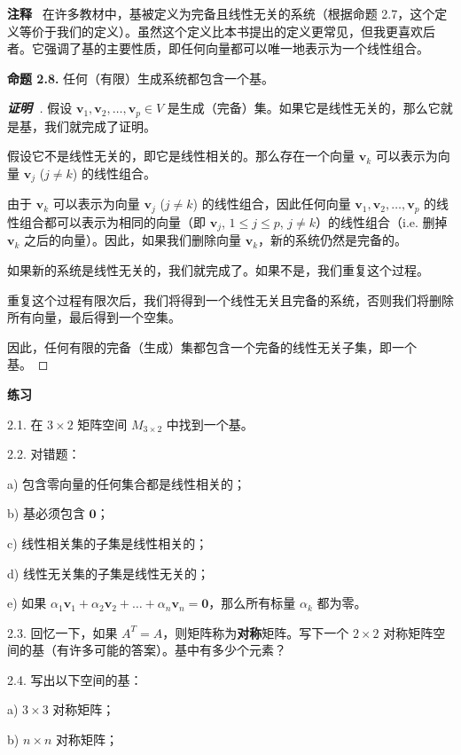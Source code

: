 \textbf{注释}~ 在许多教材中，基被定义为完备且线性无关的系统（根据命题 2.7，这个定义等价于我们的定义）。虽然这个定义比本书提出的定义更常见，但我更喜欢后者。它强调了基的主要性质，即任何向量都可以唯一地表示为一个线性组合。

\textbf{命题 2.8.} 任何（有限）生成系统都包含一个基。

\begin{proof}[\normalfont\bfseries 证明~\nopunct]
假设 $\mathbf{v}_1, \mathbf{v}_2, \dots, \mathbf{v}_p \in V$ 是生成（完备）集。如果它是线性无关的，那么它就是基，我们就完成了证明。

假设它不是线性无关的，即它是线性相关的。那么存在一个向量 $\mathbf{v}_k$ 可以表示为向量 $\mathbf{v}_j$ ($j \neq k$) 的线性组合。

由于 $\mathbf{v}_k$ 可以表示为向量 $\mathbf{v}_j$ ($j \neq k$) 的线性组合，因此任何向量 $\mathbf{v}_1, \mathbf{v}_2, \dots, \mathbf{v}_p$ 的线性组合都可以表示为相同的向量（即 $\mathbf{v}_j$, $1 \le j \le p$, $j \neq k$）的线性组合（i.e. 删掉 $\mathbf{v}_k$ 之后的向量）。因此，如果我们删除向量 $\mathbf{v}_k$，新的系统仍然是完备的。

如果新的系统是线性无关的，我们就完成了。如果不是，我们重复这个过程。

重复这个过程有限次后，我们将得到一个线性无关且完备的系统，否则我们将删除所有向量，最后得到一个空集。

因此，任何有限的完备（生成）集都包含一个完备的线性无关子集，即一个基。
\end{proof}


\textbf{练习}~

2.1. 在 $3 \times 2$ 矩阵空间 $M_{3 \times 2}$ 中找到一个基。

2.2. 对错题：

a) 包含零向量的任何集合都是线性相关的；

b) 基必须包含 $\mathbf{0}$；

c) 线性相关集的子集是线性相关的；

d) 线性无关集的子集是线性无关的；

e) 如果 $\alpha_1 \mathbf{v}_1 + \alpha_2 \mathbf{v}_2 + \dots + \alpha_n \mathbf{v}_n = \mathbf{0}$，那么所有标量 $\alpha_k$ 都为零。

2.3. 回忆一下，如果 $A^T = A$，则矩阵称为\textbf{对称}矩阵。写下一个 $2 \times 2$ 对称矩阵空间的基（有许多可能的答案）。基中有多少个元素？

2.4. 写出以下空间的基：

a) $3 \times 3$ 对称矩阵；

b) $n \times n$ 对称矩阵；

